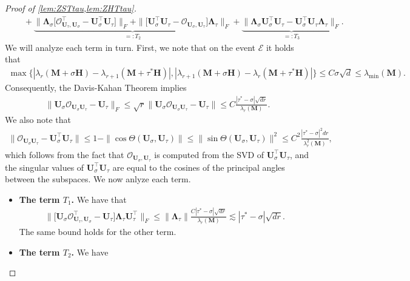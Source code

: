 \documentclass[10pt]{article}
\newcommand{\s}{^*}
\renewcommand{\t}{^{\top}}
\theoremstyle{definition}
\begin{document}
\begin{proof}[Proof of \cref{lem:ZSTtau,lem:ZHTtau}]
\begin{align*}
    &\quad + \underbrace{\| \bm{\Lambda}_{\sigma}\big[ \mathcal{O}_{\bm{U}_{\tau},\bm{U}_{\sigma}}\t - \bm{U}_{\sigma}\t \bm{U}_{\tau} \big] \|_F  + \| \big[ \bm{U}_{\sigma}\t \bm{U}_{\tau} - \mathcal{O}_{\bm{U}_{\sigma},\bm{U}_{\tau}} \big] \bm{\Lambda}_{\tau} \|_F}_{=:T_2} + \underbrace{\| \bm{\Lambda}_{\sigma}\bm{U}_{\sigma}\t \bm{U}_{\tau} - \bm{U}_{\sigma}\t \bm{U}_{\tau} \bm{\Lambda}_{\tau} \|_F}_{=:T_3}.
\end{align*}
We will analyze each term in turn.  First, we note that on the event $\mathcal{E}$ it holds that 
\begin{align*}
    \max\big\{ | \lambda_{r}(\bm{M} + \sigma \bm{H}) - \lambda_{r+1}(\bm{M} + \tau\s \bm{H})|, | \lambda_{r+1}(\bm{M} + \sigma \bm{H}) - \lambda_{r}(\bm{M} + \tau\s \bm{H})| \big\} \leq C \sigma \sqrt{d} \leq \lambda_{\min}(\bm{M}).
\end{align*}
Consequently, the Davis-Kahan Theorem implies
\begin{align*}
    \| \bm{U}_{\sigma} \mathcal{O}_{\bm{U}_{\sigma} \bm{U}_{\tau}} - \bm{U}_{\tau} \|_F \leq \sqrt{r}  \| \bm{U}_{\sigma} \mathcal{O}_{\bm{U}_{\sigma} \bm{U}_{\tau}} - \bm{U}_{\tau} \| \leq C \frac{|\tau\s - \sigma| \sqrt{dr}}{\lambda_r(\bm{M})}.
\end{align*}
We also note that
\begin{align*}
    \| \mathcal{O}_{\bm{U}_{\sigma} \bm{U}_{\tau}} - \bm{U}_{\sigma}\t \bm{U}_{\tau} \| \leq 1 - \| \cos\Theta(\bm{U}_{\sigma},\bm{U}_{\tau}) \|  \leq \| \sin\Theta(\bm{U}_{\sigma},\bm{U}_{\tau}) \|^2 \leq C^2 \frac{|\tau\s - \sigma |^2 dr}{\lambda_r^2(\bm{M})},
\end{align*}
which follows from the fact that $\mathcal{O}_{\bm{U}_{\sigma},\bm{U}_{\tau}}$ is computed from the SVD of $\bm{U}_{\sigma}\t \bm{U}_{\tau}$, and the singular values of $\bm{U}_{\sigma}\t \bm{U}_{\tau}$ are equal to the cosines of the principal angles between the subspaces.  We now anlyze each term.
\begin{itemize}
    \item \textbf{The term $T_1$.}  We have that 
    \begin{align*}
         \| \big[ \bm{U}_{\sigma} \mathcal{O}_{\bm{U}_{\tau},\bm{U}_{\sigma}}\t - \bm{U}_{\tau} \big] \bm{\Lambda}_{\tau} \bm{U}_{\tau}\t \|_F \leq \| \bm{\Lambda}_{\tau} \| \frac{C |\tau\s - \sigma| \sqrt{dr}}{\lambda_r(\bm{M})} \lesssim | \tau\s - \sigma | \sqrt{dr}.
    \end{align*}
    The same bound holds for the other term.  
    \item \textbf{The term $T_2$.} We have 

\end{itemize}
\end{proof}
\end{document}
